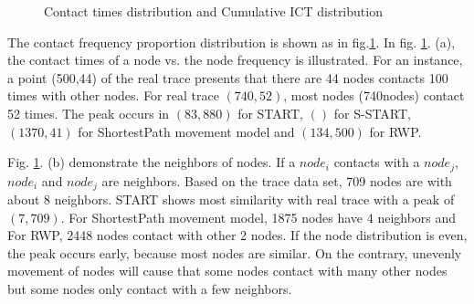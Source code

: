 \begin{figure}[htbp]
\centering
{}

\caption{Contact times distribution and Cumulative ICT distribution}\label{figure_contacts}
\end{figure}

The contact frequency proportion distribution is shown as in fig.\ref{figure_contacts}. In fig. \ref{figure_contacts}. (a), the contact times of a node vs. the node frequency is illustrated. For an instance, a point (500,44) of the real trace presents that there are 44 nodes contacts 100 times with other nodes. For real trace $(740,52)$, most nodes (740nodes) contact 52 times.  The peak occurs in $(83, 880)$ for START, $()$ for S-START, $(1370,41)$ for ShortestPath movement model and $(134, 500)$ for RWP.

Fig. \ref{figure_contacts}. (b) demonstrate the neighbors of nodes. If a $node_i$ contacts with a $node_j$, $node_i$ and $node_j$ are neighbors. Based on the trace data set, 709 nodes are with about 8 neighbors. START shows most similarity with real trace with a peak of  $(7,709)$.  For ShortestPath movement model, 1875 nodes have 4 neighbors and For RWP, 2448 nodes contact with other 2 nodes. If the node distribution is even, the peak occurs early, because most nodes are similar. On the contrary, unevenly movement of nodes will cause that some nodes contact with many other nodes but some nodes only contact with a few neighbors.

